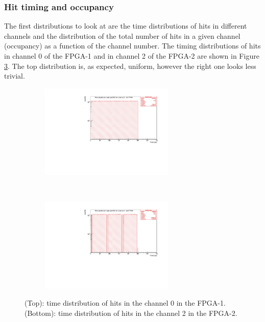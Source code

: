 \subsubsection{Hit timing and occupancy}\label{over}
The first distributions to look at are the time distributions of hits in 
different channels and the distribution of the total number of hits
in a given channel (occupancy) as a function of the channel number.
The timing distributions of hits in channel 0 of the FPGA-1
and in channel 2 of the FPGA-2 are shown in Figure \ref{fig:1}.
The top distribution is, as expected, uniform, however the right one looks
less trivial.
\begin{figure}[!h]
  \begin{subfigure}[b]{\textwidth}
      \centering
      \includegraphics[width=0.7\textwidth]{figures/pdf/figure_00007_timedistr_roc_simulation_ch0_281.pdf}
      \label{fig:t1}
  \end{subfigure}
\\
  \begin{subfigure}[b]{\textwidth}
      \centering
      \includegraphics[width=0.7\textwidth]{figures/pdf/figure_00003_timedistr_roc_simulation_ch2_281.pdf}
      \label{fig:t2}
  \end{subfigure}
     \caption{(Top): time distribution of hits in the channel 0 in the FPGA-1.
     (Bottom): time distribution of hits in the channel 2 in the FPGA-2.}
     \label{fig:1}
\end{figure}
